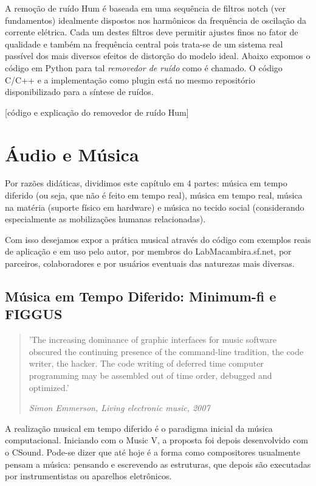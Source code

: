 A remoção de ruído Hum é baseada em uma sequência de filtros notch
(ver fundamentos) idealmente dispostos nos harmônicos da frequência de
oscilação da corrente elétrica. Cada um destes filtros deve permitir
ajustes finos no fator de qualidade e também na frequência central
pois trata-se de um sistema real passível dos mais diversos efeitos de
distorção do modelo ideal. Abaixo expomos o código em Python para tal
\emph{removedor de ruído} como é chamado. O código C/C++ e a
implementação como plugin está no mesmo repositório disponibilizado
para a síntese de ruídos.

[código e explicação do removedor de ruído Hum]

\section{Áudio e Música}

Por razões didáticas, dividimos este capítulo em 4 partes: música em
tempo diferido (ou seja, que não é feito em tempo real), música em
tempo real, música na matéria (suporte físico em hardware) e música no
tecido social (considerando especialmente as mobilizações humanas
relacionadas).

Com isso desejamos expor a prática musical através do código com
exemplos reais de aplicação e em uso pelo autor, por membros do
LabMacambira.sf.net, por parceiros, colaboradores e por usuários
eventuais das naturezas mais diversas.


\subsection{Música em Tempo Diferido: Minimum-fi e FIGGUS}

\begin{quotation}
\small 'The increasing dominance of graphic interfaces for music
software obscured the continuing presence of the command-line
tradition, the code writer, the hacker. The code writing of deferred
time computer programming may be assembled out of time order, debugged
and optimized.'

\emph{Simon Emmerson, Living electronic music, 2007}
\end{quotation}

A realização musical em tempo diferido é o paradigma inicial da música
computacional. Iniciando com o Music V, a proposta foi depois
desenvolvido com o CSound. Pode-se dizer que até hoje é a forma como
compositores usualmente pensam a música: pensando e escrevendo as
estruturas, que depois são executadas por instrumentistas ou aparelhos
eletrônicos.

